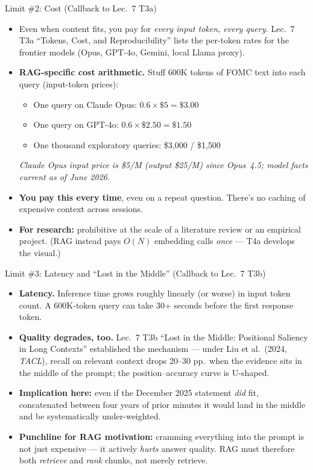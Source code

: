 \begin{frame}{Limit \#2: Cost (Callback to Lec.\ 7 T3a)}
\begin{itemize}
\item Even when content fits, you pay for \emph{every input token, every query.} Lec.\ 7 T3a ``Tokens, Cost, and Reproducibility'' lists the per-token rates for the frontier models (Opus, GPT-4o, Gemini, local Llama proxy).

\medskip
\item \textbf{RAG-specific cost arithmetic.} Stuff 600K tokens of FOMC text into each query (input-token prices):
\begin{itemize}
    \item One query on Claude Opus: $0.6 \times \$5 = \$3.00$
    \item One query on GPT-4o: $0.6 \times \$2.50 = \$1.50$
    \item One thousand exploratory queries: \$3{,}000 / \$1{,}500
\end{itemize}
\smallskip
{\footnotesize\textit{Claude Opus input price is \$5/M (output \$25/M) since Opus~4.5; model facts current as of June 2026.}}

\medskip
\item \textbf{You pay this every time}, even on a repeat question. There's no caching of expensive context across sessions.

\medskip
\item \textbf{For research:} prohibitive at the scale of a literature review or an empirical project. (RAG instead pays $O(N)$ embedding calls \emph{once} --- T4a develops the visual.)
\end{itemize}
\end{frame}

\begin{frame}{Limit \#3: Latency and ``Lost in the Middle'' (Callback to Lec.\ 7 T3b)}
\begin{itemize}
\item \textbf{Latency.} Inference time grows roughly linearly (or worse) in input token count. A 600K-token query can take 30+ seconds before the first response token.

\medskip
\item \textbf{Quality degrades, too.} Lec.\ 7 T3b ``Lost in the Middle: Positional Saliency in Long Contexts'' established the mechanism --- under Liu et al.\ (2024, \emph{TACL}), recall on relevant context drops 20--30 pp.\ when the evidence sits in the middle of the prompt; the position--accuracy curve is U-shaped.

\medskip
\item \textbf{Implication here:} even if the December 2025 statement \emph{did} fit, concatenated between four years of prior minutes it would land in the middle and be systematically under-weighted.

\medskip
\item \textbf{Punchline for RAG motivation:} cramming everything into the prompt is not just expensive --- it actively \emph{hurts} answer quality. RAG must therefore both \emph{retrieve} and \emph{rank} chunks, not merely retrieve.
\end{itemize}
\end{frame}

